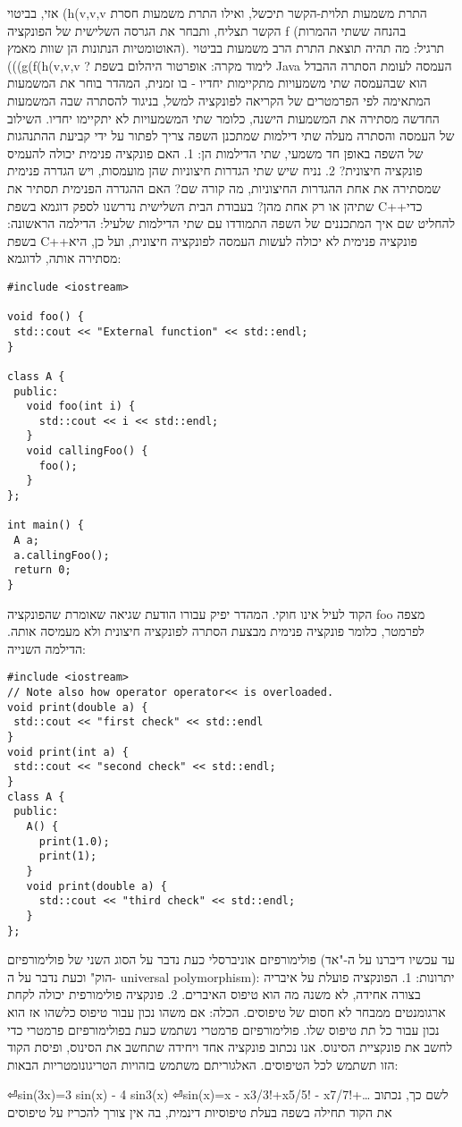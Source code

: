       אזי, בביטוי (h(v,v,v התרת משמעות תלוית-הקשר תיכשל, ואילו התרת משמעות חסרת הקשר תצליח, ותבחר את הגרסה השלישית של הפונקציה f (בהנחה ששתי ההמרות האוטומטיות הנתונות הן שוות מאמץ).
      תרגיל: מה תהיה תוצאת התרת הרב משמעות בביטוי (((g(f(h(v,v,v ?
      לימוד מקרה: אופרטור היהלום בשפת Java
      העמסה לעומת הסתרה
      ההבדל הוא שבהעמסה שתי משמעויות מתקיימות יחדיו - בו זמנית, המהדר בוחר את המשמעות המתאימה לפי הפרמטרים של הקריאה לפונקציה למשל, בניגוד להסתרה שבה המשמעות החדשה מסתירה את המשמעות הישנה, כלומר שתי המשמעויות לא יתקיימו יחדיו.
      השילוב של העמסה והסתרה מעלה שתי דילמות שמתכנן השפה צריך לפתור על ידי קביעת ההתנהגות של השפה באופן חד משמעי, שתי הדילמות הן:
      1. האם פונקציה פנימית יכולה להעמיס פונקציה חיצונית?
      2. נניח שיש שתי הגדרות חיצוניות שהן מועמסות, ויש הגדרה פנימית שמסתירה את אחת ההגדרות החיצוניות, מה קורה שם? האם ההגדרה הפנימית תסתיר את שתיהן או רק אחת מהן?
      בעבודת הבית השלישית נדרשנו לספק דוגמא בשפת C++כדי להחליט שם איך המתכננים של השפה התמודדו עם שתי הדילמות שלעיל:
      הדילמה הראשונה: בשפת C++פונקציה פנימית לא יכולה לעשות העמסה לפונקציה חיצונית, ועל כן, היא מסתירה אותה, לדוגמא:

\begin{verbatim}
#include <iostream>

void foo() {
 std::cout << "External function" << std::endl;
}

class A {
 public:
   void foo(int i) {
     std::cout << i << std::endl;
   }
   void callingFoo() {
     foo();
   }
};

int main() {
 A a;
 a.callingFoo();
 return 0;
}
\end{verbatim}

      הקוד לעיל אינו חוקי. המהדר יפיק עבורו הודעת שגיאה שאומרת שהפונקציה foo מצפה לפרמטר, כלומר פונקציה פנימית מבצעת הסתרה לפונקציה חיצונית ולא מעמיסה אותה.
      הדילמה השנייה:
\begin{verbatim}
#include <iostream>
// Note also how operator operator<< is overloaded.
void print(double a) {
 std::cout << "first check" << std::endl
}
void print(int a) {
 std::cout << "second check" << std::endl;
}
class A {
 public:
   A() {
     print(1.0);
     print(1);
   }
   void print(double a) {
     std::cout << "third check" << std::endl;
   }
};
\end{verbatim}

      פולימורפיזם אוניברסלי
      כעת נדבר על הסוג השני של פולימורפיזם (עד עכשיו דיברנו על ה-"אד הוק" וכעת נדבר על ה- universal polymorphism):
      יתרונות:
      1. הפונקציה פועלת על איבריה בצורה אחידה, לא משנה מה הוא טיפוס האיברים.
      2. פונקציה פולימורפית יכולה לקחת ארגומנטים ממבחר לא חסום של טיפוסים.
      הכלה:
      אם משהו נכון עבור טיפוס כלשהו אז הוא נכון עבור כל תת טיפוס שלו.
      פולימורפיזם פרמטרי
      נשתמש כעת בפולימורפיזם פרמטרי כדי לחשב את פונקציית הסינוס. אנו נכתוב פונקציה אחד ויחידה שתחשב את הסינוס, ופיסת הקוד הזו תשתמש לכל הטיפוסים. האלגוריתם משתמש בזהויות הטריגונומטריות הבאות:
      \begin{ציינון}
⏎sin(3x)=3 sin(x) - 4 sin3(x)
⏎sin(x)=x - x3/3!+x5/5! - x7/7!+…
      לשם כך, נכתוב את הקוד תחילה בשפה בעלת טיפוסיות דינמית, בה אין צורך להכריז על טיפוסים
  \end{ציינון}

